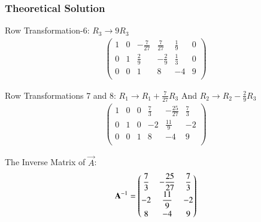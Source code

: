 \documentclass{beamer}
\begin{document}
\begin{frame}[fragile]
    \frametitle{Theoretical Solution}
Row Transformation-6: $R_3 \rightarrow 9R_3$
\begin{align}
\left(
\begin{array}{ccc|ccc}
1 & 0 & -\frac{7}{27} & \frac{7}{27} & \frac{1}{9} & 0 \\
0 & 1 & \frac{2}{9} & -\frac{2}{9} & \frac{1}{3} & 0 \\
0 & 0 & 1 & 8 & -4 & 9 \\
\end{array}
\right)
\end{align}

Row Transformations 7 and 8: $R_1 \rightarrow R_1 + \frac{7}{27}R_3 $ And $R_2 \rightarrow R_2 - \frac{2}{9}R_3 $
\begin{align}
\left(
\begin{array}{ccc|ccc}
1 & 0 & 0 & \frac{7}{3} & -\frac{25}{27} & \frac{7}{3} \\
0 & 1 & 0 & -2 & \frac{11}{9} & -2 \\
0 & 0 & 1 & 8 & -4 & 9 \\
\end{array}
\right)
\end{align}

The Inverse Matrix of $\vec{A}$:
\begin{align}
\mathbf{A}^{-1} = \begin{pmatrix} \dfrac{7}{3} & -\dfrac{25}{27} & \dfrac{7}{3} \\[1ex]
-2 & \dfrac{11}{9} & -2 \\[1ex]
8 & -4 & 9 \end{pmatrix}
\end{align}
\end{frame}
\end{document}
